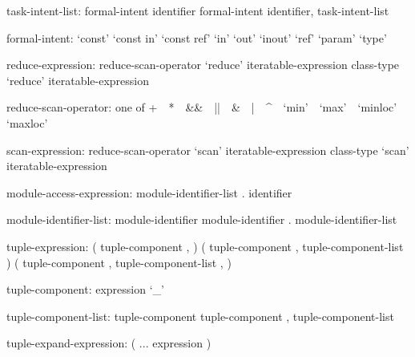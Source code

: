 \begin{syntax}
task-intent-list:
  formal-intent identifier
  formal-intent identifier, task-intent-list
\end{syntax}

\begin{syntax}
formal-intent:
  `const'
  `const in'
  `const ref'
  `in'
  `out'
  `inout'
  `ref'
  `param'
  `type'
\end{syntax}

\begin{syntax}
reduce-expression:
  reduce-scan-operator `reduce' iteratable-expression
  class-type `reduce' iteratable-expression
\end{syntax}

\begin{syntax}
reduce-scan-operator: one of
  + $ $ $ $ * $ $ $ $ && $ $ $ $ || $ $ $ $ & $ $ $ $ | $ $ $ $ ^ $ $ $ $ `min' $ $ $ $ `max' $ $ $ $ `minloc' $ $ $ $ `maxloc'
\end{syntax}

\begin{syntax}
scan-expression:
  reduce-scan-operator `scan' iteratable-expression
  class-type `scan' iteratable-expression
\end{syntax}

\begin{syntax}
module-access-expression:
  module-identifier-list . identifier
\end{syntax}

\begin{syntax}
module-identifier-list:
  module-identifier
  module-identifier . module-identifier-list
\end{syntax}

\begin{syntax}
tuple-expression:
  ( tuple-component , )
  ( tuple-component , tuple-component-list )
  ( tuple-component , tuple-component-list , )
\end{syntax}

\begin{syntax}
tuple-component:
  expression
  `_'
\end{syntax}

\begin{syntax}
tuple-component-list:
  tuple-component
  tuple-component , tuple-component-list
\end{syntax}

\begin{syntax}
tuple-expand-expression:
  ( ... expression )
\end{syntax}

